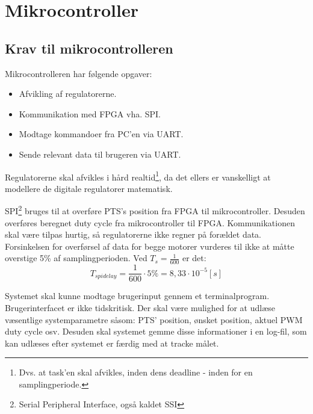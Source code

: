 \section{Mikrocontroller}
\label{sec:mikrocontroller}
%
\subsection{Krav til mikrocontrolleren}
Mikrocontrolleren har følgende opgaver: 

\begin{itemize}
\itemsep1pt
	\item Afvikling af regulatorerne.
	\item Kommunikation med FPGA vha. SPI.
	\item Modtage kommandoer fra PC'en via UART.
	\item Sende relevant data til brugeren via UART.
\end{itemize}

Regulatorerne skal afvikles i hård realtid\footnote{Dvs. at task'en skal afvikles, inden dens deadline - inden for en samplingperiode.},
da det ellers er vanskelligt at modellere de digitale regulatorer matematisk.

SPI\footnote{Serial Peripheral Interface, også kaldet SSI} bruges til at overføre PTS's position fra FPGA til mikrocontroller.
Desuden overføres beregnet duty cycle fra mikrocontroller til FPGA.
Kommunikationen skal være tilpas hurtig, så regulatorerne ikke regner på forældet data.
Forsinkelsen for overførsel af data for begge motorer vurderes til ikke at måtte overstige 5\% af samplingperioden.
Ved $T_s = \frac{1}{600}$ er det: 
\begin{equation}
	T_{spi delay} = \frac{1}{600} \cdot 5 \% = 8,33 \cdot 10^{-5}[s]
	\label{eq:uc:spi-krav}
\end{equation}

Systemet skal kunne modtage brugerinput gennem et terminalprogram.
Brugerinterfacet er ikke tidskritisk.
Der skal være mulighed for at udlæse væsentlige systemparametre såsom:
PTS' position, ønsket position, aktuel PWM duty cycle osv.
Desuden skal systemet gemme disse informationer i en log-fil,
som kan udlæses efter systemet er færdig med at tracke målet.

